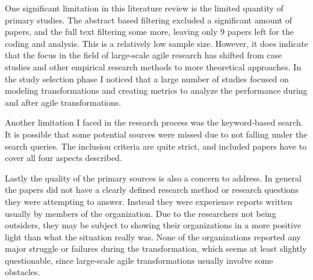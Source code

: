 One significant limitation in this literature review is the limited
quantity of primary studies. The abstract based filtering excluded a
significant amount of papers, and the full text filtering some more,
leaving only 9 papers left for the coding and analysis. This is a
relatively low sample size. However, it does indicate that the focus in
the field of large-scale agile research has shifted from case studies
and other empirical research methods to more theoretical approaches.
In the study selection phase I noticed that a large number of studies
focused on modeling transformations and creating metrics to analyze the
performance during and after agile transformations.

Another limitation I faced in the research process was the keyword-based
search. It is possible that some potential sources were missed due to
not falling under the search queries. The inclusion criteria are quite
strict, and included papers have to cover all four aspects described.

Lastly the quality of the primary sources is also a concern to address.
In general the papers did not have a clearly defined research method or
research questions they were attempting to answer. Instead they were
experience reports written usually by members of the organization.
Due to the researchers not being outsiders, they may be subject to
showing their organizations in a more positive light than what the
situation really was. None of the organizations reported any major
struggle or failures during the transformation, which seems at least
slightly questionable, since large-scale agile transformations usually
involve some obstacles.
